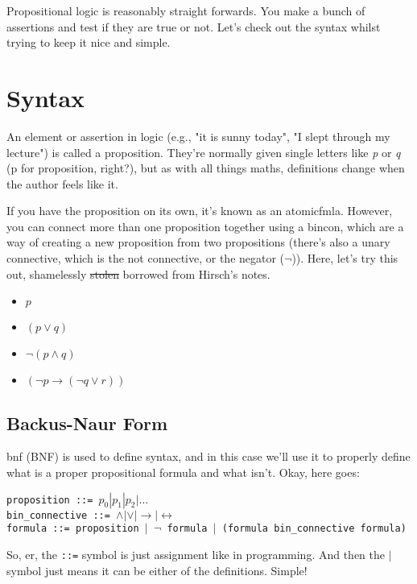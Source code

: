 Propositional logic is reasonably straight forwards. You make a bunch of assertions and test if they are true or not. Let's check out the syntax whilst trying to keep it nice and simple.

\section{Syntax}
An element or assertion in logic (e.g., "it is sunny today", "I slept through my lecture") is called a \gls{proposition}. They're normally given single letters like \textit{p} or \textit{q} (p for proposition, right?), but as with all things maths, definitions change when the author feels like it.

If you have the proposition on its own, it's known as an \gls{atomicfmla}. However, you can connect more than one proposition together using a \gls{bincon}, which are a way of creating a new proposition from two propositions (there's also a unary connective, which is the not connective, or the negator ($\neg$)). Here, let's try this out, shamelessly \sout{stolen} borrowed from Hirsch's notes.

\begin{itemize}
    \item $p$
    \item $(p \lor q)$
    \item $\neg(p \land q)$
    \item $(\neg p \to (\neg q \lor r))$
\end{itemize}

\subsection{Backus-Naur Form}
\gls{bnf} (BNF) is used to define syntax, and in this case we'll use it to properly define what is a proper propositional formula and what isn't. Okay, here goes:
\vspace{0.5cm}

\texttt{proposition ::= $p_0 | p_1 | p_2 | \dots$\\
bin\_connective ::= $\land | \lor | \to | \leftrightarrow$\\
formula ::= proposition $|$ $\neg$ formula $|$ (formula bin\_connective formula) }

\vspace{0.5cm}
So, er, the \texttt{::=} symbol is just assignment like in programming. And then the $|$ symbol just means it can be either of the definitions. Simple!

